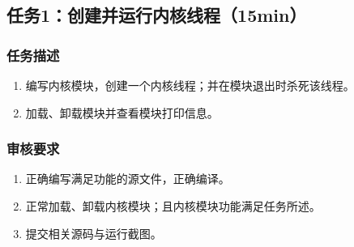 \documentclass{article}
\begin{document}
\subsection{任务1：创建并运行内核线程（15min）}

\subsubsection{任务描述}
\begin{enumerate}
	\item 编写内核模块，创建一个内核线程；并在模块退出时杀死该线程。
	\item 加载、卸载模块并查看模块打印信息。
\end{enumerate}

\subsubsection{审核要求}
\begin{enumerate}
	\item 正确编写满足功能的源文件，正确编译。
	\item 正常加载、卸载内核模块；且内核模块功能满足任务所述。
	\item 提交相关源码与运行截图。
\end{enumerate}
\end{document}
